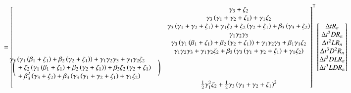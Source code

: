 \documentclass[letterpaper,11pt]{amsart}
\newcommand{\trans}[1]{{#1}^{\ensuremath{\mathsf{T}}}}
\begin{document}
\begin{align}
  &=
\trans{\begin{bmatrix}
  &\gamma_{3} + \zeta_{2} \\
  &\gamma_{3} \left( \gamma_{1} + \gamma_{2} + \zeta_{1} \right)
  + \gamma_{1} \zeta_{2} \\
  &\gamma_{3} \left( \gamma_{1} + \gamma_{2} + \zeta_{1} \right)
  + \gamma_{1} \zeta_{2}
  + \zeta_{2} \left( \gamma_{2} + \zeta_{1} \right)
  + \beta_{3} \left( \gamma_{3} + \zeta_{2} \right) \\
  &\gamma_{1} \gamma_{2} \gamma_{3} \\
  &\gamma_{3} \left(
      \gamma_{1} \left(  \beta_{1} + \zeta_{1} \right)
      + \beta_{2} \left( \gamma_{2} + \zeta_{1} \right)
    \right)
  + \gamma_{1} \gamma_{2} \gamma_{3}
  + \beta_{1} \gamma_{1} \zeta_{2} \\
  &\gamma_{1} \gamma_{2} \gamma_{3}
  + \gamma_{1} \gamma_{2} \zeta_{2}
  + \beta_{3} \left(
      \gamma_{3} \left( \gamma_{1} + \gamma_{2} + \zeta_{1} \right)
    + \gamma_{1} \zeta_{2}
    \right) \\
%
\Bigg(\mspace{-18mu}
\begin{split}
  &\gamma_{3} \left(
      \gamma_{1} \left(  \beta_{1} + \zeta_{1} \right)
      + \beta_{2} \left( \gamma_{2} + \zeta_{1} \right)
    \right)
  + \gamma_{1} \gamma_{2} \gamma_{3}
  + \gamma_{1} \gamma_{2} \zeta_{2}
  \\
  &\quad+ \zeta_{2} \left(
        \gamma_{1} \left( \beta_{1} + \zeta_{1} \right)
      + \beta_{2} \left( \gamma_{2} + \zeta_{1} \right)
    \right)
  + \beta_{3} \zeta_{2} \left( \gamma_{2} + \zeta_{1} \right)
  \\
  &\quad+ \beta_{3}^{2} \left( \gamma_{3} + \zeta_{2} \right)
  + \beta_{3} \left(
      \gamma_{3} \left( \gamma_{1} + \gamma_{2} + \zeta_{1} \right)
    + \gamma_{1} \zeta_{2}
    \right)
\end{split}
\mspace{18mu}\Bigg)
  \\
%
  &\frac{1}{2}\gamma_{1}^{2}\zeta_{2}
  + \frac{1}{2}\gamma_{3}\left( \gamma_{1}+\gamma_{2}+\zeta_{1} \right)^{2}
\end{bmatrix}}
\begin{bmatrix}
  \Delta{}t R_{n} \\
  \Delta{}t^{2} D R_{n} \\
  \Delta{}t^{2} L R_{n} \\
  \Delta{}t^{3} D^{2} R_{n} \\
  \Delta{}t^{3} D L R_{n} \\
  \Delta{}t^{3} L D R_{n} \\

\end{bmatrix}
\end{align}
\end{document}
